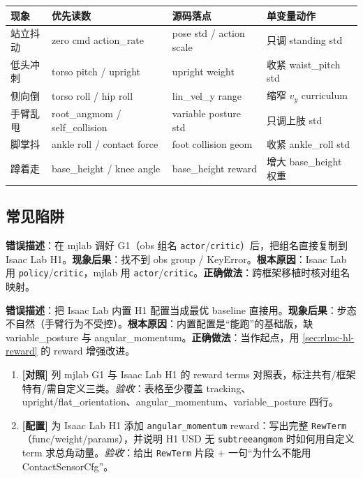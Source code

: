 \begin{center}
\small
\begin{tabular}{p{2.0cm}p{2.8cm}p{2.6cm}p{3.0cm}}
\hline
现象 & 优先读数 & 源码落点 & 单变量动作 \\
\hline
站立抖动 & zero cmd action\_rate & pose std / action scale & 只调 standing std \\
低头冲刺 & torso pitch / upright & upright weight & 收紧 waist\_pitch std \\
侧向倒 & torso roll / hip roll & lin\_vel\_y range & 缩窄 $v_y$ curriculum \\
手臂乱甩 & root\_angmom / self\_collision & variable posture std & 只调上肢 std \\
脚掌抖 & ankle roll / contact force & foot collision geom & 收紧 ankle\_roll std \\
蹲着走 & base\_height / knee angle & base\_height reward & 增大 base\_height 权重 \\
\hline
\end{tabular}
\end{center}

\subsection{常见陷阱}
\begin{pitfall}
\textbf{错误描述}：在 mjlab 调好 G1（obs 组名 \texttt{actor}/\texttt{critic}）后，把组名直接复制到 Isaac Lab H1。\textbf{现象后果}：找不到 obs group / KeyError。\textbf{根本原因}：Isaac Lab 用 \texttt{policy}/\texttt{critic}，mjlab 用 \texttt{actor}/\texttt{critic}。\textbf{正确做法}：跨框架移植时核对组名映射。
\end{pitfall}

\begin{pitfall}
\textbf{错误描述}：把 Isaac Lab 内置 H1 配置当成最优 baseline 直接用。\textbf{现象后果}：步态不自然（手臂行为不受控）。\textbf{根本原因}：内置配置是“能跑”的基础版，缺 variable\_posture 与 angular\_momentum。\textbf{正确做法}：当作起点，用 \cref{sec:rlmc-hl-reward} 的 reward 增强改进。
\end{pitfall}

\begin{practice}[本节动手]
\begin{enumerate}
  \item \textbf{[对照]} 列 mjlab G1 与 Isaac Lab H1 的 reward terms 对照表，标注共有/框架特有/需自定义三类。\emph{验收}：表格至少覆盖 tracking、upright/flat\_orientation、angular\_momentum、variable\_posture 四行。
  \item \textbf{[配置]} 为 Isaac Lab H1 添加 \texttt{angular\_momentum} reward：写出完整 \texttt{RewTerm}（func/weight/params），并说明 H1 USD 无 \texttt{subtreeangmom} 时如何用自定义 term 求总角动量。\emph{验收}：给出 \texttt{RewTerm} 片段 $+$ 一句“为什么不能用 ContactSensorCfg”。
\end{enumerate}
\end{practice}

